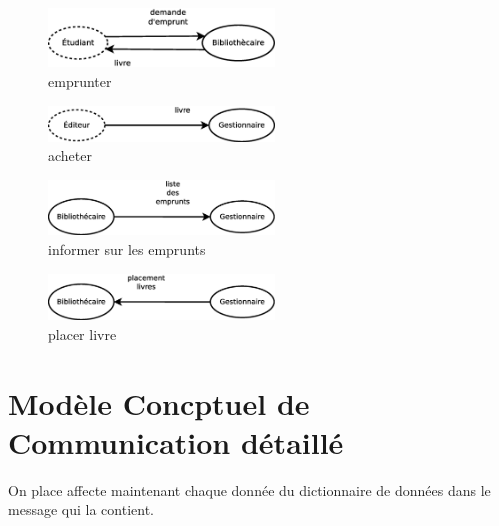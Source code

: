 \begin{figure}[!htb]
    \begin{center}
    \includegraphics[width=6cm]{images/cc2_mcc2.eps}
    \caption{\label{cc2_mcc2} emprunter}
    \end{center}
\end{figure}

\begin{figure}[!htb]
    \begin{center}
    \includegraphics[width=6cm]{images/cc2_mcc3.eps}
    \caption{\label{cc2_mcc3} acheter}
    \end{center}
\end{figure}

\begin{figure}[!htb]
    \begin{center}
    \includegraphics[width=6cm]{images/cc2_mcc4.eps}
    \caption{\label{cc2_mcc4} informer sur les emprunts}
    \end{center}
\end{figure}

\begin{figure}[!htb]
    \begin{center}
    \includegraphics[width=6cm]{images/cc2_mcc5.eps}
    \caption{\label{cc2_mcc5} placer livre}
    \end{center}
\end{figure}

\newpage
\section*{Modèle Concptuel de Communication détaillé}

On place affecte maintenant chaque donnée du dictionnaire de données dans le message qui la contient.

